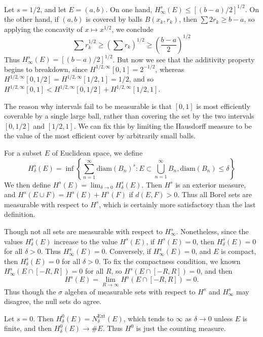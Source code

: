 \begin{example}
	Let $s = 1/2$, and let $E = (a,b)$. On one hand, $H^s_\infty(E) \leq [(b-a)/2]^{1/2}$. On the other hand, if $(a,b)$ is covered by balls $B(x_k,r_k)$, then $\sum 2r_k \geq b - a$, so applying the concavity of $x \mapsto x^{1/2}$, we conclude
	\[ \sum r_k^{1/2} \geq \left( \sum r_k \right)^{1/2} \geq \left( \frac{b - a}{2} \right)^{1/2} \]
	Thus $H^s_\infty(E) = [(b-a)/2]^{1/2}$. But now we see that the additivity property begins to breakdown, since $H^{1/2,\infty}[0,1] = 2^{-1/2}$, whereas $H^{1/2,\infty}[0,1/2] = H^{1/2,\infty}[1/2,1] = 1/2$, and so $H^{1/2,\infty}[0,1] < H^{1/2,\infty}[0,1/2] + H^{1/2,\infty}[1/2,1]$.
\end{example}

The reason why intervals fail to be measurable is that $[0,1]$ is most efficiently coverable by a single large ball, rather than covering the set by the two intervals $[0,1/2]$ and $[1/2,1]$. We can fix this by limiting the Hausdorff measure to be the value of the most efficient cover by arbitrarily small balls.

For a subset $E$ of Euclidean space, we define
%
\[ H_\delta^s(E) = \inf \left\{ \sum_{n = 1}^\infty \text{diam}(B_n)^s : E \subset \bigcup_{n = 1}^\infty B_n, \text{diam}(B_n) \leq \delta \right\} \]
%
We then define $H^s(E) = \lim_{\delta \to 0} H_\delta^s(E)$. Then $H^s$ is an exterior measure, and $H^s(E \cup F) = H^s(E) + H^s(F)$ if $d(E,F) > 0$. Thus all Borel sets are measurable with respect to $H^s$, which is certainly more satisfactory than the last definition.

\begin{remark}
	Though not all sets are measurable with respect to $H^s_\infty$. Nonetheless, since the values $H^s_\delta(E)$ increase to the value $H^s(E)$, if $H^s(E) = 0$, then $H^s_\delta(E) = 0$ for all $\delta > 0$. Thus $H^s_\infty(E) = 0$. Conversely, if $H^s_\infty(E) = 0$, and $E$ is compact, then $H^s_\delta(E) = 0$ for all $\delta > 0$. To fix the compactness condition, we known $H^s_\infty(E \cap [-R,R]) = 0$ for all $R$, so $H^s(E \cap [-R,R]) = 0$, and then
	\[ H^s(E) = \lim_{R \to \infty} H^s(E \cap [-R,R]) = 0. \]
	Thus though the $\sigma$ algebra of measurable sets with respect to $H^s$ and $H^s_\infty$ may disagree, the null sets do agree.
\end{remark}

\begin{example}
	Let $s = 0$. Then $H_\delta^0(E) = N_\delta^{\text{Ext}}(E)$, which tends to $\infty$ as $\delta \to 0$ unless $E$ is finite, and then $H_\delta^0(E) \to \# E$. Thus $H^0$ is just the counting measure.
\end{example}

